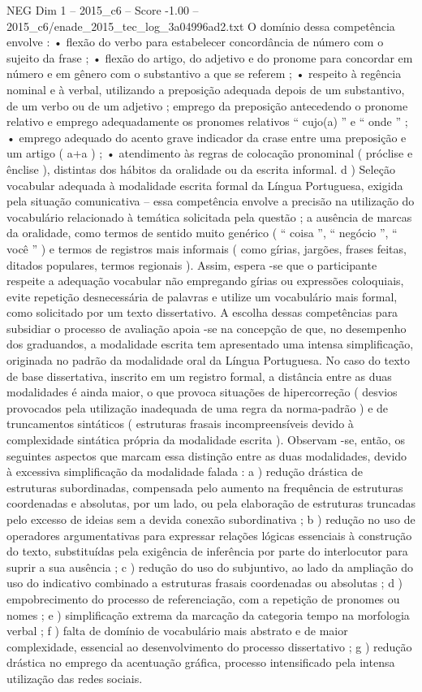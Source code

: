 \begin{textsample}{NEG Dim 1 – 2015\_c6 – Score -1.00 – 2015\_c6/enade\_2015\_tec\_log\_3a04996ad2.txt}
O domínio dessa competência envolve : • flexão do verbo para estabelecer concordância de número com o sujeito da frase ; • flexão do artigo, do adjetivo e do pronome para concordar em número e em gênero com o substantivo a que se referem ; • respeito à regência nominal e à verbal, utilizando a preposição adequada depois de um substantivo, de um verbo ou de um adjetivo ; emprego da preposição antecedendo o pronome relativo e emprego adequadamente os pronomes relativos “ cujo(a) ” e “ onde ” ; • emprego adequado do acento grave indicador da crase entre uma preposição e um artigo ( a+a ) ; • atendimento às regras de colocação pronominal ( próclise e ênclise ), distintas dos hábitos da oralidade ou da escrita informal. d ) Seleção vocabular adequada à modalidade escrita formal da Língua Portuguesa, exigida pela situação comunicativa – essa competência envolve a precisão na utilização do vocabulário relacionado à temática solicitada pela questão ; a ausência de marcas da oralidade, como termos de sentido muito genérico ( “ coisa ”, “ negócio ”, “ você ” ) e termos de registros mais informais ( como gírias, jargões, frases feitas, ditados populares, termos regionais ).
Assim, espera -se que o participante respeite a adequação vocabular não empregando gírias ou expressões coloquiais, evite repetição desnecessária de palavras e utilize um vocabulário mais formal, como solicitado por um texto dissertativo.
A escolha dessas competências para subsidiar o processo de avaliação apoia -se na concepção de que, no desempenho dos graduandos, a modalidade escrita tem apresentado uma intensa simplificação, originada no padrão da modalidade oral da Língua Portuguesa.
No caso do texto de base dissertativa, inscrito em um registro formal, a distância entre as duas modalidades é ainda maior, o que provoca situações de hipercorreção ( desvios provocados pela utilização inadequada de uma regra da norma-padrão ) e de truncamentos sintáticos ( estruturas frasais incompreensíveis devido à complexidade sintática própria da modalidade escrita ).
Observam -se, então, os seguintes aspectos que marcam essa distinção entre as duas modalidades, devido à excessiva simplificação da modalidade falada : a ) redução drástica de estruturas subordinadas, compensada pelo aumento na frequência de estruturas coordenadas e absolutas, por um lado, ou pela elaboração de estruturas truncadas pelo excesso de ideias sem a devida conexão subordinativa ; b ) redução no uso de operadores argumentativas para expressar relações lógicas essenciais à construção do texto, substituídas pela exigência de inferência por parte do interlocutor para suprir a sua ausência ; c ) redução do uso do subjuntivo, ao lado da ampliação do uso do indicativo combinado a estruturas frasais coordenadas ou absolutas ; d ) empobrecimento do processo de referenciação, com a repetição de pronomes ou nomes ; e ) simplificação extrema da marcação da categoria tempo na morfologia verbal ; f ) falta de domínio de vocabulário mais abstrato e de maior complexidade, essencial ao desenvolvimento do processo dissertativo ; g ) redução drástica no emprego da acentuação gráfica, processo intensificado pela intensa utilização das redes sociais.

\end{textsample}

